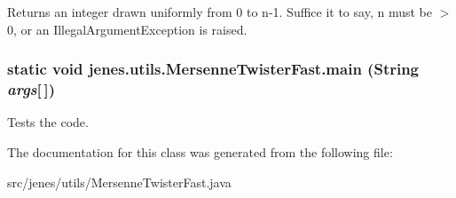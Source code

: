 Returns an integer drawn uniformly from 0 to n-1. Suffice it to say, n must be $>$ 0, or an IllegalArgumentException is raised. \hypertarget{classjenes_1_1utils_1_1_mersenne_twister_fast_5c955ea4cf1b925290dd92ddecc0c510}{
\subsubsection[main]{\setlength{\rightskip}{0pt plus 5cm}static void jenes.utils.MersenneTwisterFast.main (String {\em args}\mbox{[}$\,$\mbox{]})}}
\label{classjenes_1_1utils_1_1_mersenne_twister_fast_5c955ea4cf1b925290dd92ddecc0c510}


Tests the code. 

The documentation for this class was generated from the following file:\begin{CompactItemize}
\item 
src/jenes/utils/MersenneTwisterFast.java\end{CompactItemize}
